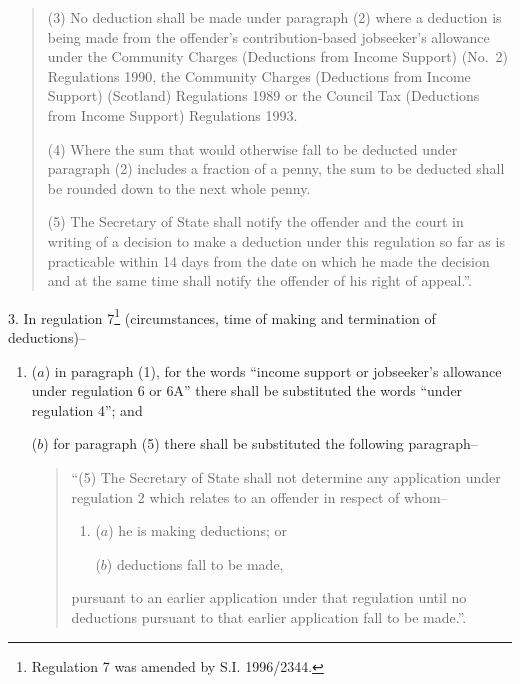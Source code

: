 \documentclass[12pt,a4paper]{article}
\begin{document}
\begin{quotation}
(3) No deduction shall be made under paragraph (2) where a deduction is being made from the offender’s contribution-based jobseeker’s allowance under the Community Charges (Deductions from Income Support) (No.\ 2) Regulations 1990, the Community Charges (Deductions from Income Support) (Scotland) Regulations 1989 or the Council Tax (Deductions from Income Support) Regulations 1993.

(4) Where the sum that would otherwise fall to be deducted under paragraph (2) includes a fraction of a penny, the sum to be deducted shall be rounded down to the next whole penny.

(5) The Secretary of State shall notify the offender and the court in writing of a decision to make a deduction under this regulation so far as is practicable within 14 days from the date on which he made the decision and at the same time shall notify the offender of his right of appeal.”.
\end{quotation}

\medskip

3.  In regulation 7\footnote{\frenchspacing Regulation 7 was amended by S.I. 1996/2344.} (circumstances, time of making and termination of deductions)–
\begin{enumerate}\item[]
($a$) in paragraph (1), for the words “income support or jobseeker’s allowance under regulation 6 or 6A” there shall be substituted the words “under regulation 4”; and

($b$) for paragraph (5) there shall be substituted the following paragraph–
\begin{quotation}
“(5) The Secretary of State shall not determine any application under regulation 2 which relates to an offender in respect of whom–
\begin{enumerate}\item[]
($a$) he is making deductions; or

($b$) deductions fall to be made,
\end{enumerate}
pursuant to an earlier application under that regulation until no deductions pursuant to that earlier application fall to be made.”.
\end{quotation}
\end{enumerate}

\medskip
\end{document}
